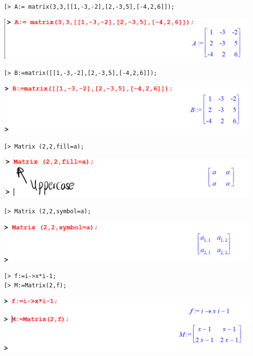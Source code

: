 \documentclass[
]{book}
\theoremstyle{definition}
\theoremstyle{definition}
\theoremstyle{definition}
\theoremstyle{definition}
\theoremstyle{remark}
\begin{document}
\begin{verbatim}
[> A:= matrix(3,3,[[1,-3,-2],[2,-3,5],[-4,2,6]]);
\end{verbatim}

\includegraphics{figures/Lesson 4/fig3.png}

\begin{verbatim}
[> B:=matrix([[1,-3,-2],[2,-3,5],[-4,2,6]]);
\end{verbatim}

\includegraphics{figures/Lesson 4/fig4.png}

\begin{verbatim}
[> Matrix (2,2,fill=a);
\end{verbatim}

\includegraphics{figures/Lesson 4/fig5.png}

\begin{verbatim}
[> Matrix (2,2,symbol=a);
\end{verbatim}

\includegraphics{figures/Lesson 4/fig6.png}

\begin{verbatim}
[> f:=i->x*i-1;
[> M:=Matrix(2,f);
\end{verbatim}

\includegraphics{figures/Lesson 4/fig7.png}
\end{document}
